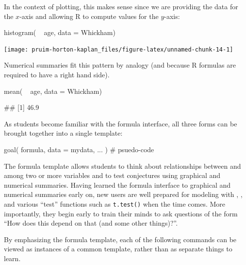 \noindent
In the context of plotting, this makes sense since we are providing the
data for the \(x\)-axis and allowing R to compute values for the
\(y\)-axis:

\begin{Schunk}
\begin{Sinput}
histogram( ~ age, data = Whickham)
\end{Sinput}


\begin{center}\texttt{[image: pruim-horton-kaplan\_files/figure-latex/unnamed-chunk-14-1]} \end{center}

\end{Schunk}

\noindent
Numerical summaries fit this pattern by analogy (and because R formulas
are required to have a right hand side).

\begin{Schunk}
\begin{Sinput}
mean( ~ age, data = Whickham)
\end{Sinput}
\begin{Soutput}
## [1] 46.9
\end{Soutput}
\end{Schunk}

As students become familiar with the formula interface, all three forms
can be brought together into a single template:

\begin{Schunk}
\begin{Sinput}
goal( formula, data = mydata, ... )      # psuedo-code
\end{Sinput}
\end{Schunk}

\noindent
The formula template allows students to think about relationships
between and among two or more variables and to test conjectures using
graphical and numerical summaries. Having learned the formula interface
to graphical and numerical summaries early on, new users are well
prepared for modeling with , , and various
``test'' functions such as \texttt{t.test()} when the time comes. More
importantly, they begin early to train their minds to ask questions of
the form ``How does this depend on that (and some other things)?''.

By emphasizing the formula template, each of the following commands can
be viewed as instances of a common template, rather than as separate
things to learn.

